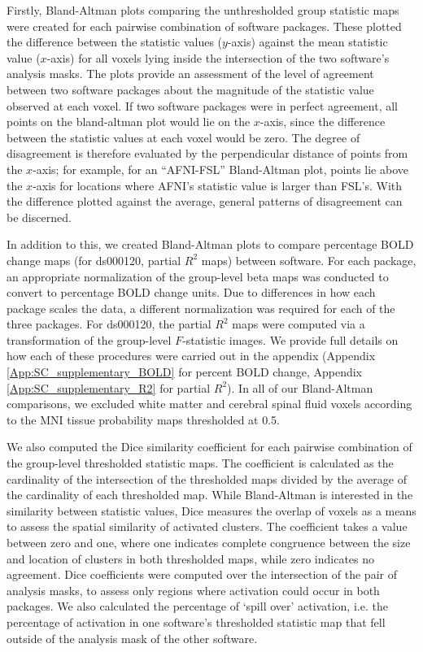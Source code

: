 Firstly, Bland-Altman plots comparing the unthresholded group statistic maps were created for each pairwise combination of software packages. These plotted the difference between the statistic values ($y$-axis) against the mean statistic value ($x$-axis) for all voxels lying inside the intersection of the two software's analysis masks. The plots provide an assessment of the level of agreement between two software packages about the magnitude of the statistic value observed at each voxel. If two software packages were in perfect agreement, all points on the bland-altman plot would lie on the $x$-axis, since the difference between the statistic values at each voxel would be zero. The degree of disagreement is therefore evaluated by the perpendicular distance of points from the $x$-axis; for example, for an ``AFNI-FSL'' Bland-Altman plot, points lie above the $x$-axis for locations where AFNI's statistic value is larger than FSL's. With the difference plotted against the average, general patterns of disagreement can be discerned.

In addition to this, we created Bland-Altman plots to compare percentage BOLD change maps (for ds000120, partial $R^{2}$ maps) between software. For each package, an appropriate normalization of the group-level beta maps was conducted to convert to percentage BOLD change units. Due to differences in how each package scales the data, a different normalization was required for each of the three packages. For ds000120, the partial $R^{2}$ maps were computed via a transformation of the group-level $F$-statistic images. We provide full details on how each of these procedures were carried out in the appendix (Appendix \ref{App:SC_supplementary_BOLD} for percent BOLD change, Appendix \ref{App:SC_supplementary_R2} for partial $R^{2}$). In all of our Bland-Altman comparisons, we excluded white matter and cerebral spinal fluid voxels according to the MNI tissue probability maps thresholded at 0.5. 

We also computed the Dice similarity coefficient for each pairwise combination of the group-level thresholded statistic maps. The coefficient is calculated as the cardinality of the intersection of the thresholded maps divided by the average of the cardinality of each thresholded map. While Bland-Altman is interested in the similarity between statistic values, Dice measures the overlap of voxels as a means to assess the spatial similarity of activated clusters. The coefficient takes a value between zero and one, where one indicates complete congruence between the size and location of clusters in both thresholded maps, while zero indicates no agreement. Dice coefficients were computed over the intersection of the pair of analysis masks, to assess only regions where activation could occur in both packages. We also calculated the percentage of `spill over' activation, i.e. the percentage of activation in one software's thresholded statistic map that fell outside of the analysis mask of the other software. 

